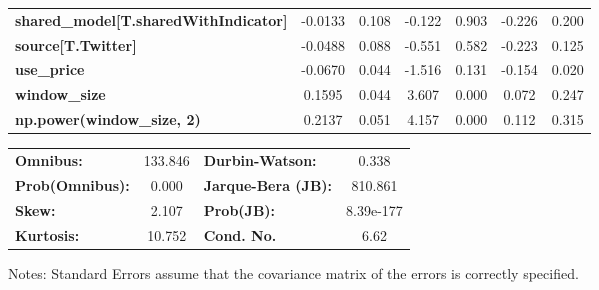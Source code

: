 \begin{center}
\begin{tabular}{lcccccc}
\textbf{shared\_model[T.sharedWithIndicator]} &      -0.0133  &        0.108     &    -0.122  &         0.903        &       -0.226    &        0.200     \\
\textbf{source[T.Twitter]}                    &      -0.0488  &        0.088     &    -0.551  &         0.582        &       -0.223    &        0.125     \\
\textbf{use\_price}                           &      -0.0670  &        0.044     &    -1.516  &         0.131        &       -0.154    &        0.020     \\
\textbf{window\_size}                         &       0.1595  &        0.044     &     3.607  &         0.000        &        0.072    &        0.247     \\
\textbf{np.power(window\_size, 2)}            &       0.2137  &        0.051     &     4.157  &         0.000        &        0.112    &        0.315     \\
\bottomrule
\end{tabular}
\begin{tabular}{lclc}
\textbf{Omnibus:}       & 133.846 & \textbf{  Durbin-Watson:     } &     0.338  \\
\textbf{Prob(Omnibus):} &   0.000 & \textbf{  Jarque-Bera (JB):  } &   810.861  \\
\textbf{Skew:}          &   2.107 & \textbf{  Prob(JB):          } & 8.39e-177  \\
\textbf{Kurtosis:}      &  10.752 & \textbf{  Cond. No.          } &      6.62  \\
\bottomrule
\end{tabular}
\end{center}

Notes: \newline
 [1] Standard Errors assume that the covariance matrix of the errors is correctly specified.
